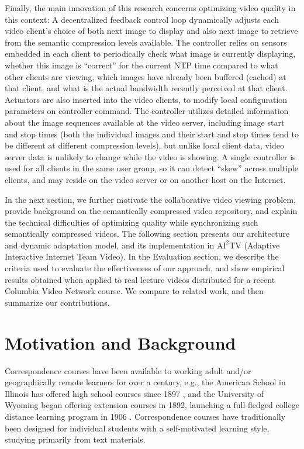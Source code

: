 \documentclass{sig-alternate}
\begin{document}
Finally, the main innovation of this research concerns optimizing
video quality in this context: A decentralized feedback control loop
dynamically adjusts each video client's choice of both next image to
display and also next image to retrieve from the semantic compression
levels available.  The controller relies on sensors embedded in each
client to periodically check what image is currently displaying,
whether this image is ``correct'' for the current NTP time compared to
what other clients are viewing, which images have already been
buffered (cached) at that client, and what is the actual bandwidth
recently perceived at that client.  Actuators are also inserted into
the video clients, to modify local configuration parameters on
controller command. The controller utilizes detailed information about
the image sequences available at the video server, including image
start and stop times (both the individual images and their start and
stop times tend to be different at different compression levels), but
unlike local client data, video server data is unlikely to change
while the video is showing.  A single controller is used for all
clients in the same user group, so it can detect ``skew'' across
multiple clients, and may reside on the video server or on another
host on the Internet.

In the next section, we further motivate the collaborative video
viewing problem, provide background on the semantically compressed
video repository, and explain the technical difficulties of optimizing
quality while synchronizing such semantically compressed videos. The
following section presents our architecture and dynamic adaptation
model, and its implementation in $\mathrm{AI}^2$TV (Adaptive
Interactive Internet Team Video).  In the Evaluation section, we
describe the criteria used to evaluate the effectiveness of our
approach, and show empirical results obtained when applied to real
lecture videos distributed for a recent Columbia Video Network
course. We compare to related work, and then summarize our
contributions.

\section{Motivation and Background} \label{background}


Correspondence courses have been available to working adult and/or
geographically remote learners for over a century, e.g., the American
School in Illinois has offered high school courses since 1897
\cite{AmericanSchool}, and the University of Wyoming began offering
extension courses in 1892, launching a full-fledged college distance
learning program in 1906 \cite{UWyoming}.  Correspondence courses have
traditionally been designed for individual students with a
self-motivated learning style, studying primarily from text materials.
\end{document}
